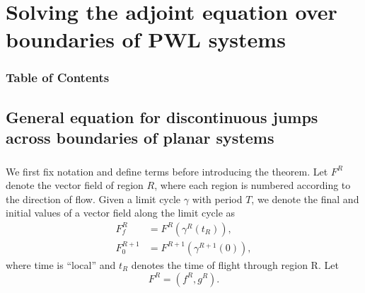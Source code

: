\documentclass{beamer}
\begin{document}
  
  
% 
%   



\section{Solving the adjoint equation over boundaries of PWL systems}
\begin{frame}
\frametitle{Table of Contents}
\tableofcontents[currentsection]
\end{frame}



\subsection{General equation for discontinuous jumps across boundaries of planar systems}
  \begin{frame}
 \frametitle{\insertsection}
    	\framesubtitle{\insertsubsection}
We first fix notation and define terms before introducing the theorem.   Let $F^R$ denote the vector field of region $R$, where each region is numbered according to the direction of flow.  Given a limit cycle $\gamma$ with period $T$, we denote the final and initial values of a vector field along the limit cycle as
\begin{equation}
\begin{split}
F^R_f &= F^R(\gamma^R(t_R)),\\
F^{R+1}_0 &= F^{R+1}(\gamma^{R+1}(0)),
\end{split}
\end{equation}
where time is ``local'' and $t_R$ denotes the time of flight through region R.  Let
\begin{equation}
 F^{R} = (f^{R}, g^{R}).
\end{equation}



  \end{frame}
  
\end{document}
